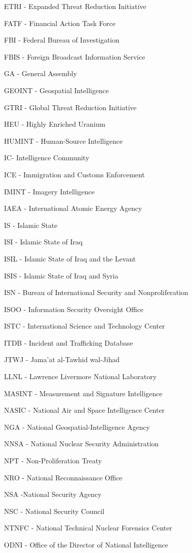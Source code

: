 \documentclass{report}
\begin{document}
ETRI - Expanded Threat Reduction Initiative

FATF - Financial Action Task Force

FBI - Federal Bureau of Investigation

FBIS - Foreign Broadcast Information Service

GA - General Assembly

GEOINT - Geospatial Intelligence

GTRI - Global Threat Reduction Initiative

HEU - Highly Enriched Uranium

HUMINT - Human-Source Intelligence

IC- Intelligence Community

ICE - Immigration and Customs Enforcement

IMINT - Imagery Intelligence 

IAEA - International Atomic Energy Agency 

IS - Islamic State

ISI - Islamic State of Iraq

ISIL - Islamic State of Iraq and the Levant

ISIS - Islamic State of Iraq and Syria

ISN - Bureau of International Security and Nonproliferation

ISOO - Information Security Oversight Office

ISTC - International Science and Technology Center

ITDB - Incident and Trafficking Database


JTWJ - Jama'at al-Tawhid wal-Jihad 

LLNL - Lawrence Livermore National Laboratory

MASINT - Measurement and Signature Intelligence 

NASIC - National Air and Space Intelligence Center 

NGA - National Geospatial-Intelligence Agency 

NNSA - National Nuclear Security Administration 

NPT - Non-Proliferation Treaty

NRO - National Reconnaissance Office

NSA -National Security Agency

NSC - National Security Council  

NTNFC - National Technical Nuclear Forensics Center

ODNI - Office of the Director of National Intelligence
\end{document}
